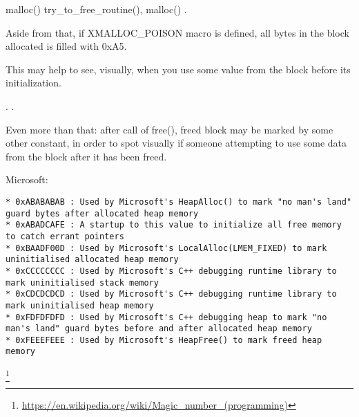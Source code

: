  malloc() 
try\_to\_free\_routine(),  malloc() .

{Aside from that, if} XMALLOC\_POISON
{ macro is defined, all bytes in the block allocated is filled with} 0xA5.

{This may help to see, visually, when you use some value from the block before its initialization}.

  .
.

{Even more than that: after call of free(), freed block may be marked by some other constant, in order
to spot visually if someone attempting to use some data from the block after it has been freed}.

 Microsoft:

\begin{lstlisting}
* 0xABABABAB : Used by Microsoft's HeapAlloc() to mark "no man's land" guard bytes after allocated heap memory
* 0xABADCAFE : A startup to this value to initialize all free memory to catch errant pointers
* 0xBAADF00D : Used by Microsoft's LocalAlloc(LMEM_FIXED) to mark uninitialised allocated heap memory
* 0xCCCCCCCC : Used by Microsoft's C++ debugging runtime library to mark uninitialised stack memory
* 0xCDCDCDCD : Used by Microsoft's C++ debugging runtime library to mark uninitialised heap memory
* 0xFDFDFDFD : Used by Microsoft's C++ debugging heap to mark "no man's land" guard bytes before and after allocated heap memory
* 0xFEEEFEEE : Used by Microsoft's HeapFree() to mark freed heap memory
\end{lstlisting}
\footnote{\url{https://en.wikipedia.org/wiki/Magic_number_(programming)}}

